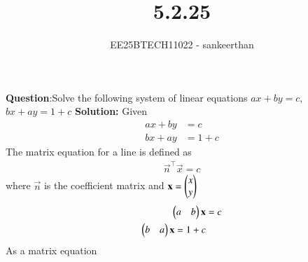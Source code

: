 \documentclass[journal]{IEEEtran}
\begin{document}


\title{5.2.25}
\author{EE25BTECH11022 - sankeerthan}
{\let\newpage\relax\maketitle}

\renewcommand{\thefigure}{\theenumi}
\renewcommand{\thetable}{\theenumi}
\setlength{\intextsep}{10pt} %


\renewcommand{\thetable}{\theenumi}

\textbf{Question}:Solve the following system of linear equations $ax+by =c$, $bx+ay =1+c$
\textbf{Solution:}  
Given  
\begin{align}
ax+by &= c \\
bx+ay &=1+c 
\end{align}
The matrix equation for a line is defined as
\begin{align}
    \vec{n}^\top\vec{x}=c
\end{align}
where $\vec{n}$ is the coefficient matrix and $\mathbf{x}=\begin{pmatrix}x\\y\end{pmatrix}$
\begin{align}
       \begin{pmatrix}a & b\end{pmatrix}\mathbf{x}&=c \\ 
       \begin{pmatrix}b & a\end{pmatrix}\mathbf{x}=1+c
\end{align}
As a matrix equation
\end{document}
